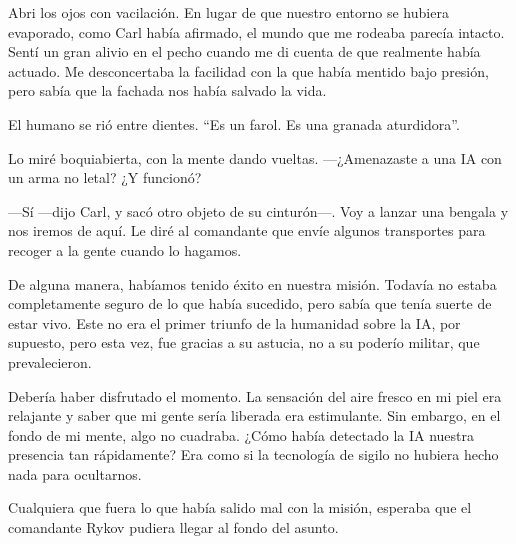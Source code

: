 Abri los ojos con vacilación. En lugar de que nuestro entorno se hubiera evaporado, como Carl había afirmado, el mundo que me rodeaba parecía intacto. Sentí un gran alivio en el pecho cuando me di cuenta de que realmente había actuado. Me desconcertaba la facilidad con la que había mentido bajo presión, pero sabía que la fachada nos había salvado la vida.

El humano se rió entre dientes. “Es un farol. Es una granada aturdidora”.

Lo miré boquiabierta, con la mente dando vueltas. —¿Amenazaste a una IA con un arma no letal? ¿Y funcionó?

—Sí —dijo Carl, y sacó otro objeto de su cinturón—. Voy a lanzar una bengala y nos iremos de aquí. Le diré al comandante que envíe algunos transportes para recoger a la gente cuando lo hagamos.

De alguna manera, habíamos tenido éxito en nuestra misión. Todavía no estaba completamente seguro de lo que había sucedido, pero sabía que tenía suerte de estar vivo. Este no era el primer triunfo de la humanidad sobre la IA, por supuesto, pero esta vez, fue gracias a su astucia, no a su poderío militar, que prevalecieron.

Debería haber disfrutado el momento. La sensación del aire fresco en mi piel era relajante y saber que mi gente sería liberada era estimulante. Sin embargo, en el fondo de mi mente, algo no cuadraba. ¿Cómo había detectado la IA nuestra presencia tan rápidamente? Era como si la tecnología de sigilo no hubiera hecho nada para ocultarnos.

Cualquiera que fuera lo que había salido mal con la misión, esperaba que el comandante Rykov pudiera llegar al fondo del asunto.

